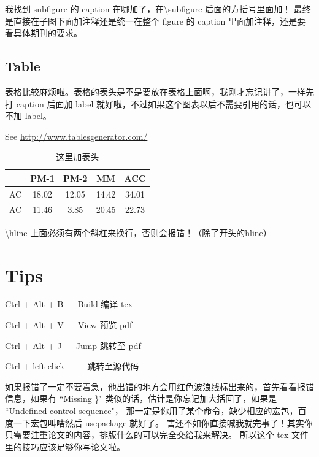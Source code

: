 我找到 subfigure 的 caption 在哪加了，在\textbackslash subfigure 后面的方括号里面加！
最终是直接在子图下面加注释还是统一在整个 figure 的 caption 里面加注释，还是要看具体期刊的要求。

\subsection{Table}
表格比较麻烦啦。表格的表头是不是要放在表格上面啊，我刚才忘记讲了，一样先打 caption
后面加 label 就好啦，不过如果这个图表以后不需要引用的话，也可以不加 label。

See \url{http://www.tablesgenerator.com/}

\begin{table}[h]
    \centering
    \begin{tabular}{|lcccc|}    %
    \hline      %
       & \textbf{PM-1}  & \textbf{PM-2}  & \textbf{MM}    & \textbf{ACC}   \\
    \hline
    AC & 18.02 & 12.05 & 14.42 & 34.01 \\
    AC & 11.46 & 3.85  & 20.45 & 22.73 \\   %
    \hline  
    \end{tabular}
    \caption{这里加表头} %
\end{table}

\textbackslash hline 上面必须有两个斜杠来换行，否则会报错！（除了开头的hline）

\section{Tips}

Ctrl + Alt + B ~~ Build 编译 tex %

Ctrl + Alt + V ~~ View  预览 pdf

Ctrl + Alt + J ~~ Jump  跳转至 pdf

Ctrl + left click ~~~~ 跳转至源代码

如果报错了一定不要着急，他出错的地方会用红色波浪线标出来的，首先看看报错信息，如果有
``Missing \}" 类似的话，估计是你忘记加大括回了，如果是 ``Undefined control sequence"，
那一定是你用了某个命令，缺少相应的宏包，百度一下宏包叫啥然后 usepackage 就好了。
害还不如你直接喊我就完事了！其实你只需要注重论文的内容，排版什么的可以完全交给我来解决。
所以这个 tex 文件里的技巧应该足够你写论文啦。

